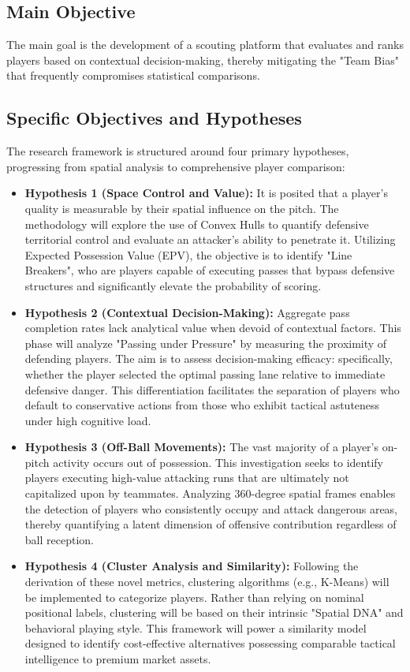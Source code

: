 \documentclass[12pt,a4paper]{article}
\begin{document}
\subsection{Main Objective}
The main goal is the development of a scouting platform that evaluates and ranks players based on contextual decision-making, thereby mitigating the "Team Bias" that frequently compromises statistical comparisons.

\subsection{Specific Objectives and Hypotheses}
The research framework is structured around four primary hypotheses, progressing from spatial analysis to comprehensive player comparison:

\begin{itemize}
    \item \textbf{Hypothesis 1 (Space Control and Value):} It is posited that a player's quality is measurable by their spatial influence on the pitch. The methodology will explore the use of Convex Hulls to quantify defensive territorial control and evaluate an attacker's ability to penetrate it. Utilizing Expected Possession Value (EPV), the objective is to identify "Line Breakers", who are players capable of executing passes that bypass defensive structures and significantly elevate the probability of scoring.
    \item \textbf{Hypothesis 2 (Contextual Decision-Making):} Aggregate pass completion rates lack analytical value when devoid of contextual factors. This phase will analyze "Passing under Pressure" by measuring the proximity of defending players. The aim is to assess decision-making efficacy: specifically, whether the player selected the optimal passing lane relative to immediate defensive danger. This differentiation facilitates the separation of players who default to conservative actions from those who exhibit tactical astuteness under high cognitive load.
    \item \textbf{Hypothesis 3 (Off-Ball Movements):} The vast majority of a player's on-pitch activity occurs out of possession. This investigation seeks to identify players executing high-value attacking runs that are ultimately not capitalized upon by teammates. Analyzing 360-degree spatial frames enables the detection of players who consistently occupy and attack dangerous areas, thereby quantifying a latent dimension of offensive contribution regardless of ball reception.
    \item \textbf{Hypothesis 4 (Cluster Analysis and Similarity):} Following the derivation of these novel metrics, clustering algorithms (e.g., K-Means) will be implemented to categorize players. Rather than relying on nominal positional labels, clustering will be based on their intrinsic "Spatial DNA" and behavioral playing style. This framework will power a similarity model designed to identify cost-effective alternatives possessing comparable tactical intelligence to premium market assets.
\end{itemize}
\end{document}
